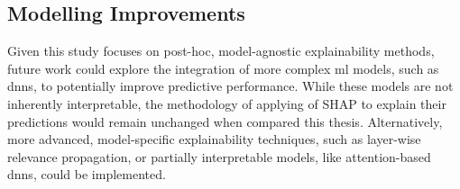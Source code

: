 \subsection{Modelling Improvements}

Given this study focuses on post-hoc, model-agnostic explainability methods, future work could explore the integration of more complex \acrshort{ml} models, such as \acrfull{dnn}s, to potentially improve predictive performance. While these models are not inherently interpretable, the methodology of applying of SHAP to explain their predictions would remain unchanged when compared this thesis. Alternatively, more advanced, model-specific explainability techniques, such as layer-wise relevance propagation, or partially interpretable models, like attention-based \acrfull{dnn}s, could be implemented.